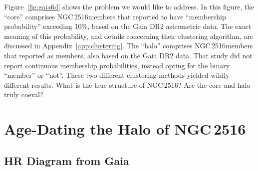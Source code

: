\documentclass[12pt,twocolumn,tighten]{aastex63}
\newcommand{\cn}{NGC\,2516} %
\begin{document}
Figure~\ref{fig:gaia6d} shows the problem we would like to address.
In this figure, the ``core'' comprises \cn members that
\citet{cantatgaudin_gaia_2018} reported to have ``membership
probability'' exceeding 10\%, based on the Gaia DR2 astrometric data.
The exact meaning of this probability, and details concerning their
clustering algorithm, are discussed in Appendix~\ref{app:clustering}.
The ``halo'' comprises \cn members that
\citet{kounkel_untangling_2019} reported as members, also based on the
Gaia DR2 data.  That study did not report continuous membership
probabilities, instead opting for the binary ``member'' or ``not''.
These two different clustering methods yielded wildly different
results.  What is the true structure of \cn?
Are the core and halo truly coeval?


\section{Age-Dating the Halo of NGC\,2516}
\label{sec:agedate}

\subsection{HR Diagram from Gaia}
\label{subsec:hr}
\end{document}

